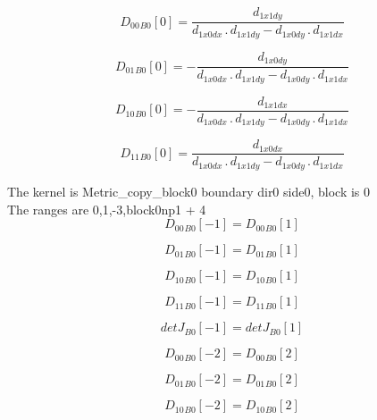 \documentclass{article}
\begin{document}
\begin{dmath}{D_{00}{_{B0}}}[{0}] = \frac{d_{1 x1 dy}}{d_{1 x0 dx} \,.\, d_{1 x1 dy} - d_{1 x0 dy} \,.\, d_{1 x1 dx}}\end{dmath}

\begin{dmath}{D_{01}{_{B0}}}[{0}] = - \frac{d_{1 x0 dy}}{d_{1 x0 dx} \,.\, d_{1 x1 dy} - d_{1 x0 dy} \,.\, d_{1 x1 dx}}\end{dmath}

\begin{dmath}{D_{10}{_{B0}}}[{0}] = - \frac{d_{1 x1 dx}}{d_{1 x0 dx} \,.\, d_{1 x1 dy} - d_{1 x0 dy} \,.\, d_{1 x1 dx}}\end{dmath}

\begin{dmath}{D_{11}{_{B0}}}[{0}] = \frac{d_{1 x0 dx}}{d_{1 x0 dx} \,.\, d_{1 x1 dy} - d_{1 x0 dy} \,.\, d_{1 x1 dx}}\end{dmath}

\noindent The kernel is Metric_copy_block0 boundary dir0 side0, block is 0\\\noindent The ranges are 0,1,-3,block0np1 + 4\\\begin{dmath}{D_{00}{_{B0}}}[{-1}] = {D_{00}{_{B0}}}[{1}]\end{dmath}

\begin{dmath}{D_{01}{_{B0}}}[{-1}] = {D_{01}{_{B0}}}[{1}]\end{dmath}

\begin{dmath}{D_{10}{_{B0}}}[{-1}] = {D_{10}{_{B0}}}[{1}]\end{dmath}

\begin{dmath}{D_{11}{_{B0}}}[{-1}] = {D_{11}{_{B0}}}[{1}]\end{dmath}

\begin{dmath}{detJ{_{B0}}}[{-1}] = {detJ{_{B0}}}[{1}]\end{dmath}

\begin{dmath}{D_{00}{_{B0}}}[{-2}] = {D_{00}{_{B0}}}[{2}]\end{dmath}

\begin{dmath}{D_{01}{_{B0}}}[{-2}] = {D_{01}{_{B0}}}[{2}]\end{dmath}

\begin{dmath}{D_{10}{_{B0}}}[{-2}] = {D_{10}{_{B0}}}[{2}]\end{dmath}
\end{document}
